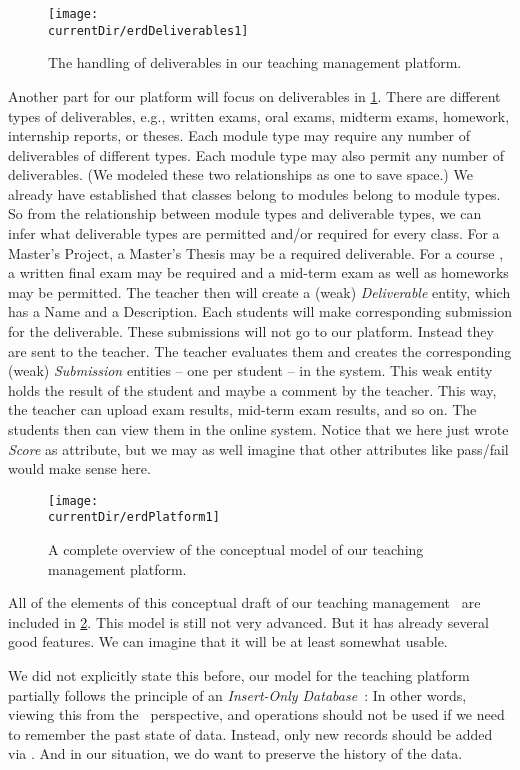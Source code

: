 \begin{figure}%
\centering%
\texttt{[image: \\currentDir/erdDeliverables1]}%
\caption{The handling of deliverables in our teaching management platform.}%
\label{fig:erdDeliverables1}%
\end{figure}%
%
Another part for our platform will focus on deliverables in \cref{fig:erdDeliverables1}.
There are different types of deliverables, e.g., written exams, oral exams, midterm exams, homework, internship reports, or theses.
Each module type may require any number of deliverables of different types.
Each module type may also permit any number of deliverables.
(We modeled these two relationships as one to save space.)
We already have established that classes belong to modules belong to module types.
So from the relationship between module types and deliverable types, we can infer what deliverable types are permitted and/or required for every class.
For a Master's Project, a Master's Thesis may be a required deliverable.
For a course , a written final exam may be required and a mid-term exam as well as homeworks may be permitted.
The teacher then will create a (weak) \emph{Deliverable} entity, which has a Name and a Description.
Each students will make corresponding submission for the deliverable.
These submissions will not go to our platform.
Instead they are sent to the teacher.
The teacher evaluates them and creates the corresponding (weak) \emph{Submission} entities -- one per student -- in the system.
This weak entity holds the result of the student and maybe a comment by the teacher.
This way, the teacher can upload exam results, mid-term exam results, and so on.
The students then can view them in the online system.
Notice that we here just wrote \emph{Score} as attribute, but we may as well imagine that other attributes like pass/fail would make sense here.

\begin{figure}%
\centering%
\texttt{[image: \\currentDir/erdPlatform1]}%
\caption{A complete overview of the conceptual model of our teaching management platform.}%
\label{fig:erdPlatform1}%
\end{figure}%
%
All of the elements of this conceptual draft of our teaching management \db\ are included in \cref{fig:erdPlatform1}.
This model is still not very advanced.
But it has already several good features.
We can imagine that it will be at least somewhat usable.

We did not explicitly state this before, our model for the teaching platform partially follows the principle of an \emph{Insert-Only Database}~\cite{P2014ACIIMDMTIMOIMD:IO}:%
%
%
%
In other words, viewing this from the \sql\ perspective,  and  operations should not be used if we need to remember the past state of data.
Instead, only new records should be added via .
And in our situation, we do want to preserve the history of the data.

